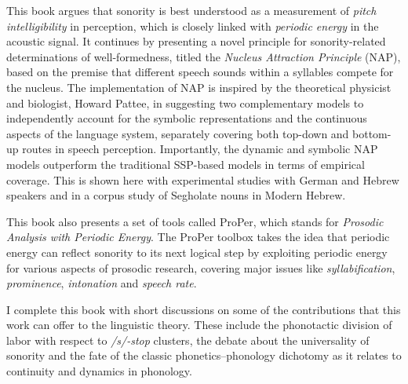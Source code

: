 This book argues that sonority is best understood as 
a measurement of \emph{pitch intelligibility} in perception, which is closely linked with \emph{periodic energy} in the acoustic signal. 
It continues by presenting a novel principle for sonority-related determinations of well-formedness, titled the \emph{Nucleus Attraction Principle} (NAP), 
based on the premise that different speech sounds within a syllables compete for the nucleus.
The implementation of NAP is inspired by the theoretical physicist and biologist, Howard Pattee, in suggesting two complementary models to independently account for the symbolic representations and the continuous aspects of the language system, separately covering both top-down and bottom-up routes in speech perception. Importantly, the dynamic and symbolic NAP models outperform the traditional SSP-based models in terms of empirical coverage. This is shown here with experimental studies with German and Hebrew speakers and in a corpus study of Segholate nouns in Modern Hebrew.

This book also presents a set of tools called ProPer, which stands for \emph{Prosodic Analysis with Periodic Energy}. The ProPer toolbox takes the idea that periodic energy can reflect sonority to its next logical step by exploiting periodic energy for various aspects of prosodic research, covering major issues like \emph{syllabification}, \emph{prominence}, \emph{intonation} and \emph{speech rate}.

I complete this book with short discussions on some of the contributions that this work can offer to the linguistic theory. These include the phonotactic division of labor with respect to \emph{/s/-stop} clusters, the debate about the universality of sonority and the fate of the classic phonetics--phonology dichotomy as it relates to continuity and dynamics in phonology. 
